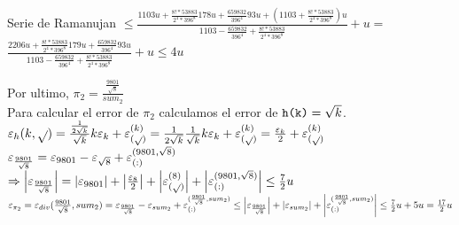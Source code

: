 \begin{subsection}{Serie de Ramanujan}
	$\leq \frac{1103u + \frac{8!*53883}{2^4*396^8}178u + \frac{659832}{396^4}93u + (1103+\frac{8!*53883}{2^4*396^8})u}{1103 - \frac{659832}{396^4} + \frac{8!*53883}{2^4*396^8}} + u =$\\
	
	$\frac{2206u + \frac{8!*53883}{2^4*396^8}179u + \frac{659832}{396^4}93u}{1103 - \frac{659832}{396^4} + \frac{8!*53883}{2^4*396^8}} + u \leq 4u$\\
	
	\pa
	
	Por ultimo, $\pi_2=\frac{\frac{9801}{\sqrt{8}}}{sum_2}$\\
	
	Para calcular el error de $\pi_2$ calculamos el error de $\texttt{h(k)}=\sqrt{k}$.\\
	
	$\varepsilon _{h}({k,\sqrt{ }}) = \frac{\frac{1}{2\sqrt{k}}}{\sqrt{k}}k\varepsilon _{k} + \varepsilon _{({\sqrt{ }})}^{({k})} = \frac{1}{2\sqrt{k}}\frac{1}{\sqrt{k}}k\varepsilon _{k} + \varepsilon _{({\sqrt{ }})}^{({k})} = \frac{\varepsilon _{k}}{2} + \varepsilon _{({\sqrt{ }})}^{({k})}$\\
	
	$\varepsilon _{\frac{9801}{\sqrt{8}}} = \varepsilon _{9801} - \varepsilon _{\sqrt{8}} + \varepsilon _{({:})}^{({9801,\sqrt{8}})}$\\
	$\Rightarrow \left|\varepsilon _{\frac{9801}{\sqrt{8}}}\right| = \left|\varepsilon _{9801}\right| + \left|\frac{\varepsilon _{8}}{2}\right| + \left|\varepsilon _{({\sqrt{ }})}^{({8})}\right| + \left|\varepsilon _{({:})}^{({9801,\sqrt{8}})}\right| \leq \frac{7}{2}u$\\
		
	$\varepsilon _{\pi_2} = \varepsilon _{div}({\frac{9801}{\sqrt{8}},sum_2}) = \varepsilon _{\frac{9801}{\sqrt{8}}} - \varepsilon _{sum_2} + \varepsilon _{({:})}^{({\frac{9801}{\sqrt{8}},sum_2})} \leq \left|\varepsilon _{\frac{9801}{\sqrt{8}}}\right| + \left|\varepsilon _{sum_2}\right| + \left|\varepsilon _{({:})}^{({\frac{9801}{\sqrt{8}},sum_2})}\right| \leq \frac{7}{2}u + 5u = \frac{17}{2}u$\\
		
\end{subsection}
